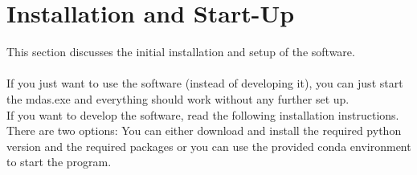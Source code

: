
\chapter{Installation and Start-Up}
This section discusses the initial installation and setup of the software.\\
\\
If you just want to use the software (instead of developing it), you can just start the mdas.exe and everything should work without any further set up.
\\If you want to develop the software, read the following installation instructions.
\\There are two options: You can either download and install the required python version and the required packages or you can use the provided conda environment to start the program.
